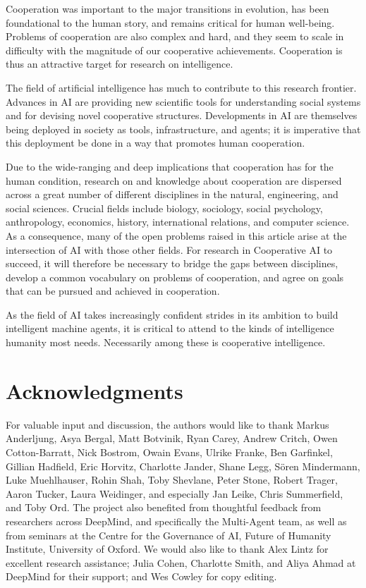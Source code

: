 \documentclass[11pt, a4paper, logo, onecolumn, nonumbering]{deepmind}
\begin{document}
Cooperation was important to the major transitions in evolution, has been foundational to the human story, and remains critical for human well-being. Problems of cooperation are also complex and hard, and they seem to scale in difficulty with the magnitude of our cooperative achievements. Cooperation is thus an attractive target for research on intelligence. 

The field of artificial intelligence has much to contribute to this research frontier. Advances in AI are providing new scientific tools for understanding social systems and for devising novel cooperative structures. Developments in AI are themselves being deployed in society as tools, infrastructure, and agents; it is imperative that this deployment be done in a way that promotes human cooperation. 

Due to the wide-ranging and deep implications that cooperation has for the human condition, research on and knowledge about cooperation are dispersed across a great number of different disciplines in the natural, engineering, and social sciences. Crucial fields include biology, sociology, social psychology, anthropology, economics, history, international relations, and computer science. As a consequence, many of the open problems raised in this article arise at the intersection of AI with those other fields. For research in Cooperative AI to succeed, it will therefore be necessary to bridge the gaps between disciplines, develop a common vocabulary on problems of cooperation, and agree on goals that can be pursued and achieved in cooperation.

As the field of AI takes increasingly confident strides in its ambition to build intelligent machine agents, it is critical to attend to the kinds of intelligence humanity most needs. Necessarily among these is cooperative intelligence. 







  
\section{Acknowledgments}
For valuable input and discussion, the authors would like to thank Markus Anderljung, Asya Bergal, Matt Botvinik, Ryan Carey, Andrew Critch, Owen Cotton-Barratt, Nick Bostrom, Owain Evans, Ulrike Franke, Ben Garfinkel, Gillian Hadfield, Eric Horvitz, Charlotte Jander, Shane Legg, S\"{o}ren Mindermann, Luke Muehlhauser, Rohin Shah, Toby Shevlane, Peter Stone, Robert Trager, Aaron Tucker, Laura Weidinger, and especially Jan Leike, Chris Summerfield, and Toby Ord. The project also benefited from thoughtful feedback from researchers across DeepMind, and specifically the Multi-Agent team, as well as from seminars at the Centre for the Governance of AI, Future of Humanity Institute, University of Oxford. We would also like to thank Alex Lintz for excellent research assistance; Julia Cohen, Charlotte Smith, and Aliya Ahmad at DeepMind for their support; and Wes Cowley for copy editing. 
  
\end{document}
